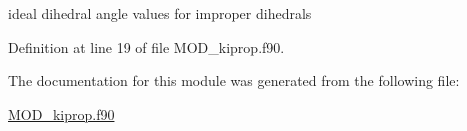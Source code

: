 ideal dihedral angle values for improper dihedrals 



Definition at line 19 of file M\-O\-D\-\_\-kiprop.\-f90.



The documentation for this module was generated from the following file\-:\begin{DoxyCompactItemize}
\item 
\hyperlink{MOD__kiprop_8f90}{M\-O\-D\-\_\-kiprop.\-f90}\end{DoxyCompactItemize}
